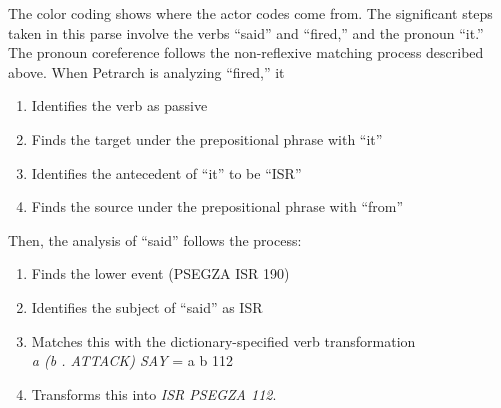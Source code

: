 \documentclass[11pt]{article}
\begin{document}
The color coding shows where the actor codes come from. The significant steps taken in this parse involve the verbs ``said'' and 
``fired,'' and the pronoun ``it.'' The pronoun coreference follows the 
non-reflexive matching process described above. When Petrarch is analyzing 
``fired,'' it \begin{enumerate} \item Identifies the verb as passive 
\item Finds the target under the prepositional phrase with ``it'' 
\item Identifies the antecedent of  ``it'' to be ``ISR''  
\item Finds the source under the prepositional phrase with ``from''
\end{enumerate}
Then, the analysis of ``said'' follows the process:
\begin{enumerate}
  \item Finds the lower event (PSEGZA ISR 190)
  \item Identifies the subject of ``said'' as ISR
  \item Matches this with the dictionary-specified verb transformation\\ \textit{a (b . ATTACK) SAY} 
  = a b 112
  \item Transforms this into \textit{ISR PSEGZA 112}.
\end{enumerate}
\end{document}
